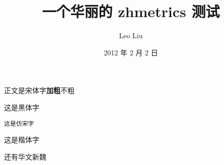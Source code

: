\documentclass[12pt,a4paper]{article}
\title{一个华丽的 zhmetrics 测试}
\author{Leo Liu}
\date{2012 年 2 月 2 日}
\begin{document}
\maketitle

正文是宋体字\textbf{加粗}不粗

\textsf{这是黑体字}

\texttt{这是仿宋字}

{这是楷体字}

{还有华文新魏}
\end{document}
